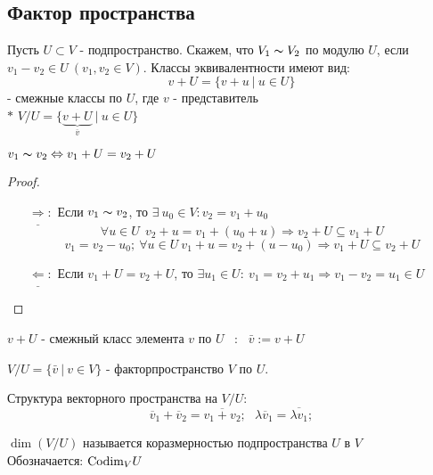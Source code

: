     \subsection*{Фактор пространства}
    \begin{definition}
        Пусть $U \subset V$ - подпространство. Скажем, что $V_1 \thicksim V_2$ по модулю $U$, если $v_1 - v_2 \in U \ (v_1,v_2 \in V)$. Классы эквивалентности имеют вид: 
        $$v + U = \{v + u \ | \ u \in U\}$$
        - смежные классы по $U$, где $v$ - представитель\\
        $*$ $V/U = \{\underbrace{v + U}_{\overline{v}}  \ | \ u \in U\}$
    \end{definition}
    \begin{subtheorem}
        $v_1 \thicksim  v_2 \Leftrightarrow v_1 + U = v_2 + U$
    \end{subtheorem}
    \begin{proof} \tab
        \begin{itemize}
            \item[$\underline{\Rightarrow} :$] Если $v_1 \thicksim v_2$, то $\exists \ u_0 \in V: v_2 = v_1 + u_0$
            $$\forall u \in U \ \ v_2 + u = v_1 + (u_0 + u) \Longrightarrow  v_2 + U \subseteq v_1 + U$$
            $$v_1 = v_2 - u_0; \ \forall u \in U \ v_1 + u = v_2 + (u - u_0) \Longrightarrow  v_1 + U \subseteq v_2 + U$$
            \item[$\underline{\Leftarrow} :$] Если $v_1 + U = v_2 + U$, то $\exists u_1 \in U: \ v_1 = v_2 + u_1 \Longrightarrow v_1 - v_2 = u_1 \in U$
        \end{itemize}
    \end{proof}
    \begin{definition}
        $v + U$ - смежный класс элемента $v$ по $U$ \ : \ $\bar{v} := v + U$
    \end{definition} 
    \begin{definition}
        $V / U = \{\bar{v} \ | \ v\in V\}$ - факторпространство $V$ по $U$.
    \end{definition} 
    \begin{definition}
        Структура векторного пространства на $V / U$:
        $$\overline{v}_1 + \overline{v}_2 = \overline{v_1 + v_2}; \ \ \ \lambda\overline{v}_1 = \overline{\lambda v_1};$$
    \end{definition} 
    \begin{definition}
        $\dim (V/U)$ называется коразмерностью подпространства $U$ в $V$ \\
        Обозначается: $\textup{Codim}_{V} U$ 
    \end{definition} 
